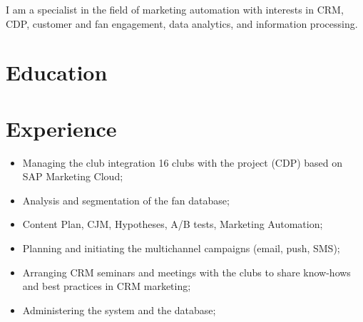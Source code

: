 \documentclass[11pt,a4paper,sans]{moderncv}
\begin{document}
 

\makecvtitle

I am a specialist in the field of marketing automation with interests in CRM, CDP, customer and fan engagement, data analytics, and information processing.

\section{Education}


\section{Experience}


\begin{itemize}
\item Managing the club integration 16 clubs with the project (CDP) based on SAP Marketing
Cloud;
\item Analysis and segmentation of the fan database;
\item Content Plan, CJM, Hypotheses, A/B tests, Marketing Automation;
\item Planning and initiating the multichannel campaigns (email, push, SMS);
\item Arranging CRM seminars and meetings with the clubs to share know-hows and best practices in CRM marketing;
\item Administering the system and the database;\newline{}
\end{itemize}

\end{document}

